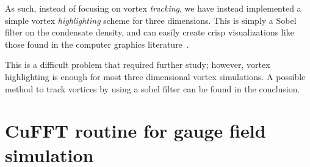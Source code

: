 As such, instead of focusing on vortex \textit{tracking}, we have instead implemented a simple vortex \textit{highlighting} scheme for three dimensions.
This is simply a Sobel filter on the condensate density, and can easily create crisp visualizations like those found in the computer graphics literature~\cite{guo2018}.


This is a difficult problem that required further study; however, vortex highlighting is enough for most three dimensional vortex simulations.
A possible method to track vortices by using a sobel filter can be found in the conclusion.

\section{CuFFT routine for gauge field simulation}

